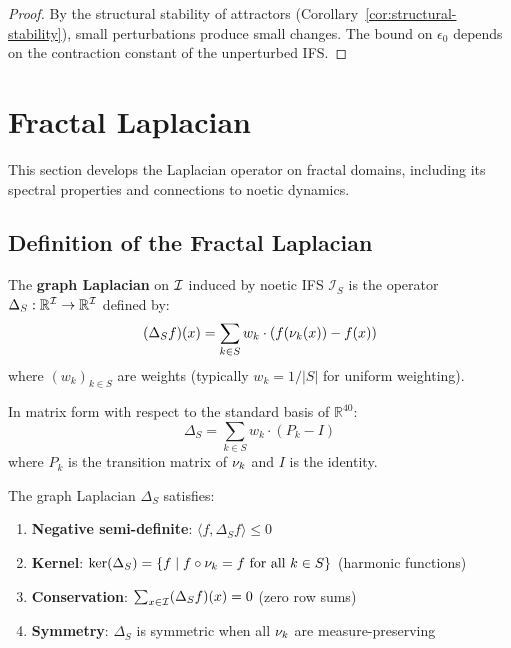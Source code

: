 \begin{proof}
By the structural stability of attractors (Corollary~\ref{cor:structural-stability}), small perturbations produce small changes. The bound on $\epsilon_0$ depends on the contraction constant of the unperturbed IFS.
\end{proof}

\section{Fractal Laplacian}
\label{sec:fractal-laplacian}

\begin{tcolorbox}[colback=blue!5!white,colframe=blue!75!black,title=\vnewthree]
This section develops the Laplacian operator on fractal domains, including its spectral properties and connections to noetic dynamics.
\end{tcolorbox}

\subsection{Definition of the Fractal Laplacian}

\begin{definition}
\label{def:graph-laplacian}
The \textbf{graph Laplacian} on $\mathcal{I}$ induced by noetic IFS $\mathcal{I}_S$ is the operator $\Delta_S : \mathbb{R}^{\mathcal{I}} \to \mathbb{R}^{\mathcal{I}}$ defined by:
\[
(\Delta_S f)(x) = \sum_{k \in S} w_k \cdot (f(\nu_{k}(x)) - f(x))
\]
where $(w_k)_{k \in S}$ are weights (typically $w_k = 1/|S|$ for uniform weighting).

In matrix form with respect to the standard basis of $\mathbb{R}^{40}$:
\[
\Delta_S = \sum_{k \in S} w_k \cdot (P_k - I)
\]
where $P_k$ is the transition matrix of $\nu_{k}$ and $I$ is the identity.
\end{definition}

\begin{proposition}
\label{prop:laplacian-props}
The graph Laplacian $\Delta_S$ satisfies:
\begin{enumerate}[label=(\roman*)]
  \item \textbf{Negative semi-definite}: $\langle f, \Delta_S f \rangle \leq 0$
  \item \textbf{Kernel}: $\ker(\Delta_S) = \{f \mid f \circ \nu_{k} = f \text{ for all } k \in S\}$ (harmonic functions)
  \item \textbf{Conservation}: $\sum_{x \in \mathcal{I}} (\Delta_S f)(x) = 0$ (zero row sums)
  \item \textbf{Symmetry}: $\Delta_S$ is symmetric when all $\nu_{k}$ are measure-preserving
\end{enumerate}
\end{proposition}

